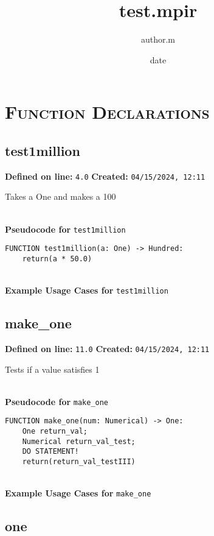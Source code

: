 \documentclass{article}
\title{test.mpir}
\author{author.m}
\date{date}
\begin{document}
\maketitle
\clearpage
\tableofcontents
\clearpage

\section{\textsc{Function Declarations}}

\subsection{test1million}

\textbf{Defined on line:} \verb|4.0| \hfill \textbf{Created:} \verb|04/15/2024, 12:11| 


Takes a One and makes a 100

\textbf{\\ Pseudocode for } \texttt{test1million}
\begin{verbatim}
FUNCTION test1million(a: One) -> Hundred:
	return(a * 50.0)
\end{verbatim}

\textbf{\\ Example Usage Cases for } \texttt{test1million}
\clearpage

\subsection{make\_one}

\textbf{Defined on line:} \verb|11.0| \hfill \textbf{Created:} \verb|04/15/2024, 12:11| 


Tests if a value satisfies 1

\textbf{\\ Pseudocode for } \texttt{make\_one}
\begin{verbatim}
FUNCTION make_one(num: Numerical) -> One:
	One return_val;
	Numerical return_val_test;
	DO STATEMENT!
	return(return_val_testIII)
\end{verbatim}

\textbf{\\ Example Usage Cases for } \texttt{make\_one}
\clearpage

\subsection{one}
\end{document}
